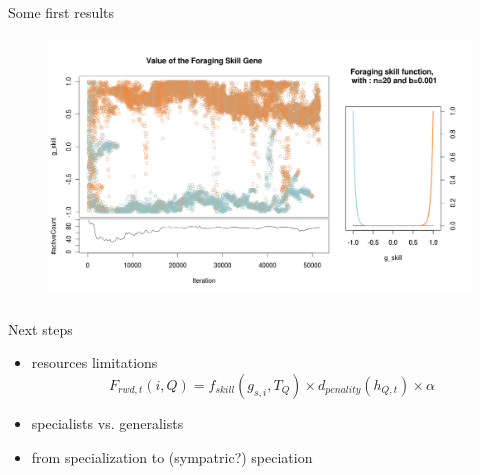 \documentclass[8pt,handout,notes=show]{beamer}
\begin{document}
\begin{frame}{Some first results}
\begin{figure}
 \includegraphics[height=7cm]{images/0523_08h28}
\end{figure}

\end{frame}



\begin{frame}{Next steps}
\begin{itemize}
 \item resources limitations
 $$F_{rwd,t}(i,Q) = f_{skill}\left(g_{s,i},T_Q\right)\times d_{penality}\left(h_{Q,t}\right)\times \alpha$$
 \item specialists vs. generalists
 \item from specialization to (sympatric?) speciation
\end{itemize}

\end{frame}



% 
% 
\end{document}

